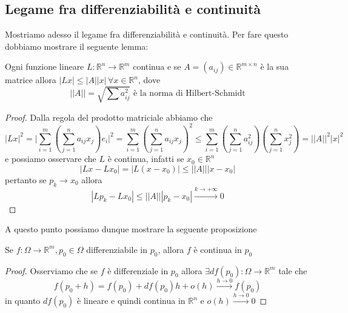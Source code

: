 \subsection{Legame fra differenziabilità e continuità}
Mostriamo adesso il legame fra differenziabilità e continuità. Per fare questo dobbiamo mostrare il seguente lemma:
\begin{lemma}
Ogni funzione lineare $L: \mathbb{R}^n \to \mathbb{R}^m$ continua e se $A = (a_{ij}) \in \mathbb{R}^{m \times n}$ è la sua matrice allora $|Lx| \leq | A | |x|  \, \forall x \in \mathbb{R}^n$, dove
$$
|| A || = \sqrt{\sum a_{ij}^2} \text{ è la norma di Hilbert-Schmidt}
$$
\end{lemma}
\begin{proof}
Dalla regola del prodotto matriciale abbiamo che
$$
|Lx|^2 = \Bigg| \sum_{i=1}^m \left( \sum_{j=1}^n a_{ij} x_j \right)e_i \Bigg|^2 = \sum_{i=1}^m \left( \sum_{j=1}^n a_{ij} x_j \right)^2 \leq \sum_{i=1}^m \left( \sum_{j=1}^n a_{ij}^2 \right)  \left( \sum_{j=1}^n x_j^2 \right) = || A ||^2 |x|^2
$$
e possiamo osservare che $L$ è continua, infatti se $x_0 \in \mathbb{R}^n$
$$
|Lx - Lx_0| = |L(x-x_0)| \leq || A || |x-x_0|
$$
pertanto se $p_k \to x_0$ allora
$$
|Lp_k - Lx_0| \leq || A || |p_k-x_0| \stackrel{k \to +\infty}{\to} 0
$$
\end{proof}
A questo punto possiamo dunque mostrare la seguente proposizione
\begin{prop}
Se $f: \Omega \to \mathbb{R}^m, p_0 \in \Omega$ differenziabile in $p_0$, allora $f$ è continua in $p_0$
\end{prop}
\begin{proof}
Osserviamo che se $f$ è differenziale in $p_0$ allora $\exists df(p_0): \Omega \to \mathbb{R}^m$ tale che
$$
f(p_0 + h) = f(p_0) + df(p_0)h + o(h) \stackrel{h \to 0}{\to} f(p_0)
$$
in quanto $df(p_0)$ è lineare e quindi continua in $\mathbb{R}^n$ e $o(h) \stackrel{h \to 0}{\to} 0$
\end{proof}
